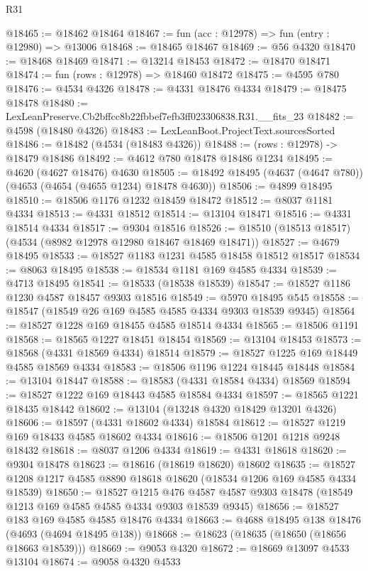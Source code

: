 \begin{lexlean}{R31}
\begin{coremodule}
@18465 := @18462 @18464
@18467 := fun (acc : @12978) => fun (entry : @12980) => @13006
@18468 := @18465 @18467
@18469 := @56 @4320
@18470 := @18468 @18469
@18471 := @13214 @18453
@18472 := @18470 @18471
@18474 := fun (rows : @12978) => @18460 @18472
@18475 := @4595 @780
@18476 := @4534 @4326
@18478 := @4331 @18476 @4334
@18479 := @18475 @18478
@18480 := LexLeanPreserve.Cb2bffcc8b22fbbef7efb3ff023306838.R31.__fits_23
@18482 := @4598 (@18480 @4326)
@18483 := LexLeanBoot.ProjectText.sourcesSorted
@18486 := @18482 (@4534 (@18483 @4326))
@18488 := (rows : @12978) -> @18479 @18486
@18492 := @4612 @780 @18478 @18486 @1234
@18495 := @4620 (@4627 @18476) @4630
@18505 := @18492 @18495 (@4637 (@4647 @780)) (@4653 (@4654 (@4655 @1234) @18478 @4630))
@18506 := @4899 @18495
@18510 := @18506 @1176 @1232 @18459 @18472
@18512 := @8037 @1181 @4334
@18513 := @4331 @18512
@18514 := @13104 @18471
@18516 := @4331 @18514 @4334
@18517 := @9304 @18516
@18526 := @18510 (@18513 @18517) (@4534 (@8982 @12978 @12980 @18467 @18469 @18471))
@18527 := @4679 @18495
@18533 := @18527 @1183 @1231 @4585 @18458 @18512 @18517
@18534 := @8063 @18495
@18538 := @18534 @1181 @169 @4585 @4334
@18539 := @4713 @18495
@18541 := @18533 (@18538 @18539)
@18547 := @18527 @1186 @1230 @4587 @18457 @9303 @18516
@18549 := @5970 @18495 @545
@18558 := @18547 (@18549 @26 @169 @4585 @4585 @4334 @9303 @18539 @9345)
@18564 := @18527 @1228 @169 @18455 @4585 @18514 @4334
@18565 := @18506 @1191
@18568 := @18565 @1227 @18451 @18454
@18569 := @13104 @18453
@18573 := @18568 (@4331 @18569 @4334) @18514
@18579 := @18527 @1225 @169 @18449 @4585 @18569 @4334
@18583 := @18506 @1196 @1224 @18445 @18448
@18584 := @13104 @18447
@18588 := @18583 (@4331 @18584 @4334) @18569
@18594 := @18527 @1222 @169 @18443 @4585 @18584 @4334
@18597 := @18565 @1221 @18435 @18442
@18602 := @13104 (@13248 @4320 @18429 @13201 @4326)
@18606 := @18597 (@4331 @18602 @4334) @18584
@18612 := @18527 @1219 @169 @18433 @4585 @18602 @4334
@18616 := @18506 @1201 @1218 @9248 @18432
@18618 := @8037 @1206 @4334
@18619 := @4331 @18618
@18620 := @9304 @18478
@18623 := @18616 (@18619 @18620) @18602
@18635 := @18527 @1208 @1217 @4585 @8890 @18618 @18620 (@18534 @1206 @169 @4585 @4334 @18539)
@18650 := @18527
    @1215
    @476
    @4587
    @4587
    @9303
    @18478
    (@18549 @1213 @169 @4585 @4585 @4334 @9303 @18539 @9345)
@18656 := @18527 @183 @169 @4585 @4585 @18476 @4334
@18663 := @4688 @18495 @138 @18476 (@4693 (@4694 @18495 @138))
@18668 := @18623 (@18635 (@18650 (@18656 @18663 @18539)))
@18669 := @9053 @4320
@18672 := @18669 @13097 @4533 @13104
@18674 := @9058 @4320 @4533

\end{coremodule}
\end{lexlean}
